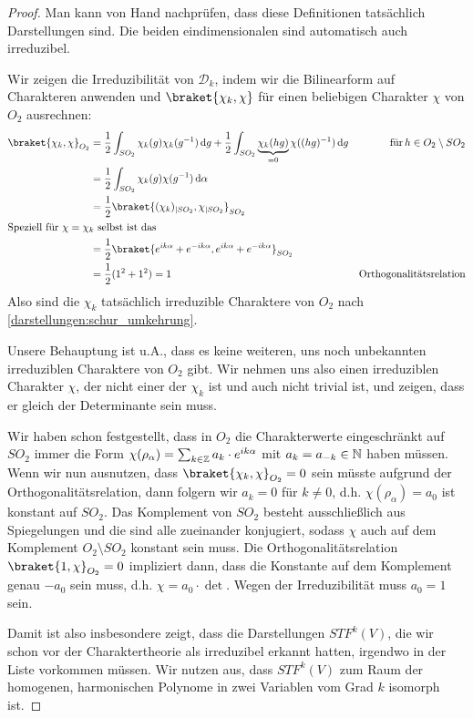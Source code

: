 \begin{proof}
Man kann von Hand nachprüfen, dass diese Definitionen tatsächlich Darstellungen sind. Die beiden eindimensionalen sind automatisch auch irreduzibel.

Wir zeigen die Irreduzibilität von $\mathcal{D}_k$, indem wir die Bilinearform auf Charakteren anwenden und $\braket{\chi_k,\chi}$ für einen beliebigen Charakter $\chi$ von $O_2$ ausrechnen:
\begin{align*}
\braket{\chi_k,\chi}_{O_2} &= \frac{1}{2}\int_{SO_2} \chi_k(g)\chi_k(g^{-1}) \dd g + \frac{1}{2}\int_{SO_2} \underbrace{\chi_k(hg)}_{=0}\chi((hg)^{-1})\dd g &\text{für}\,h\in O_2\setminus SO_2\\
&= \frac{1}{2}\int_{SO_2} \chi_k(g)\chi(g^{-1}) \dd \alpha \\
&= \frac{1}{2} \braket{ (\chi_k)_{|SO_2} , \chi_{|SO_2}}_{SO_2} \\
\intertext{Speziell für $\chi=\chi_k$ selbst ist das}
&= \frac{1}{2} \braket{e^{ik\alpha} + e^{-ik\alpha}, e^{ik\alpha} + e^{-ik\alpha}}_{SO_2} \\
&=\frac{1}{2}(1^2 + 1^2)=1 &\text{Orthogonalitätsrelation}
\end{align*}
Also sind die $\chi_k$ tatsächlich irreduzible Charaktere von $O_2$ nach \ref{darstellungen:schur_umkehrung}.

\medbreak
Unsere Behauptung ist u.A., dass es keine weiteren, uns noch unbekannten irreduziblen Charaktere von $O_2$ gibt. Wir nehmen uns also einen irreduziblen Charakter $\chi$, der nicht einer der $\chi_k$ ist und auch nicht trivial ist, und zeigen, dass er gleich der Determinante sein muss.

\smallbreak
Wir haben schon festgestellt, dass in $O_2$ die Charakterwerte eingeschränkt auf $SO_2$ immer die Form $\chi(\rho_\alpha) = \sum_{k\in\mathbb{Z}} a_k\cdot  e^{ik\alpha}$ mit $a_k=a_{-k}\in\mathbb{N}$ haben müssen. Wenn wir nun ausnutzen, dass $\braket{\chi_k,\chi}_{O_2}=0$ sein müsste aufgrund der Orthogonalitätsrelation, dann folgern wir $a_k=0$ für $k\neq 0$, d.h. $\chi(\rho_\alpha)=a_0$ ist konstant auf $SO_2$. Das Komplement von $SO_2$ besteht ausschließlich aus Spiegelungen und die sind alle zueinander konjugiert, sodass $\chi$ auch auf dem Komplement $O_2\setminus SO_2$ konstant sein muss. Die Orthogonalitätsrelation $\braket{1,\chi}_{O_2}=0$ impliziert dann, dass die Konstante auf dem Komplement genau $-a_0$ sein muss, d.h. $\chi = a_0\cdot \det$. Wegen der Irreduzibilität muss $a_0=1$ sein.

\medbreak
Damit ist also insbesondere zeigt, dass die Darstellungen $STF^k(V)$, die wir schon vor der Charaktertheorie als irreduzibel erkannt hatten, irgendwo in der Liste vorkommen müssen. Wir nutzen aus, dass $STF^k(V)$ zum Raum der homogenen, harmonischen Polynome in zwei Variablen vom Grad $k$ isomorph ist.


\end{proof}
